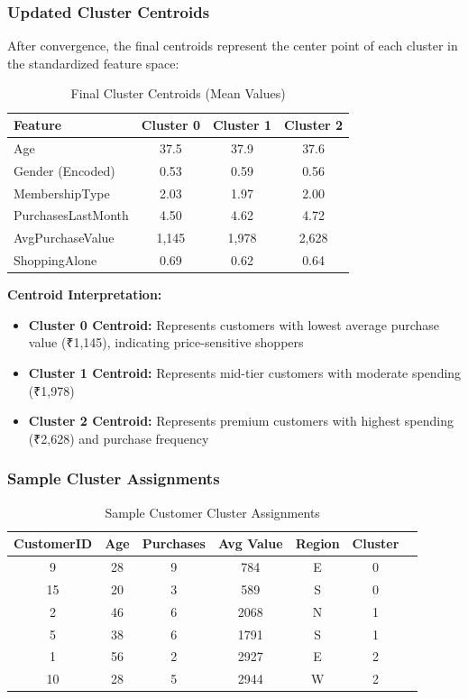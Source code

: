 \documentclass[12pt,a4paper]{article}
\begin{document}
\subsubsection{Updated Cluster Centroids}
After convergence, the final centroids represent the center point of each cluster in the standardized feature space:

\begin{table}[H]
\centering
\small
\begin{tabular}{@{}lccc@{}}
\toprule
\textbf{Feature} & \textbf{Cluster 0} & \textbf{Cluster 1} & \textbf{Cluster 2} \\ \midrule
Age & 37.5 & 37.9 & 37.6 \\
Gender (Encoded) & 0.53 & 0.59 & 0.56 \\
MembershipType & 2.03 & 1.97 & 2.00 \\
PurchasesLastMonth & 4.50 & 4.62 & 4.72 \\
AvgPurchaseValue & 1,145 & 1,978 & 2,628 \\
ShoppingAlone & 0.69 & 0.62 & 0.64 \\ \bottomrule
\end{tabular}
\caption{Final Cluster Centroids (Mean Values)}
\end{table}

\textbf{Centroid Interpretation:}
\begin{itemize}
    \item \textbf{Cluster 0 Centroid:} Represents customers with lowest average purchase value (₹1,145), indicating price-sensitive shoppers
    \item \textbf{Cluster 1 Centroid:} Represents mid-tier customers with moderate spending (₹1,978)
    \item \textbf{Cluster 2 Centroid:} Represents premium customers with highest spending (₹2,628) and purchase frequency
\end{itemize}

\subsubsection{Sample Cluster Assignments}
\begin{table}[H]
\centering
\small
\begin{tabular}{@{}ccccccc@{}}
\toprule
\textbf{CustomerID} & \textbf{Age} & \textbf{Purchases} & \textbf{Avg Value} & \textbf{Region} & \textbf{Cluster} \\ \midrule
9 & 28 & 9 & 784 & E & 0 \\
15 & 20 & 3 & 589 & S & 0 \\
2 & 46 & 6 & 2068 & N & 1 \\
5 & 38 & 6 & 1791 & S & 1 \\
1 & 56 & 2 & 2927 & E & 2 \\
10 & 28 & 5 & 2944 & W & 2 \\ \bottomrule
\end{tabular}
\caption{Sample Customer Cluster Assignments}
\end{table}
\end{document}
